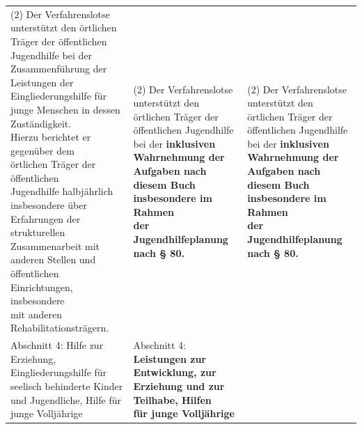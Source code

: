 \documentclass[10pt,a4paper,landscape]{article}
\begin{document}
\begin{longtable}{|L{8.2cm}|L{8.2cm}|L{8.2cm}|}
\hhline{|---|}
(2) Der Verfahrenslotse unterstützt den  \newline örtlichen Träger der öffentlichen  \newline Jugendhilfe bei der \textcolor{diffred}{Zusammenführung} der  \newline \textcolor{diffred}{Leistungen} der \textcolor{diffred}{Eingliederungshilfe für  \newline junge Menschen in dessen Zuständigkeit.  \newline Hierzu berichtet er gegenüber dem  \newline örtlichen Träger der öffentlichen  \newline Jugendhilfe halbjährlich insbesondere über  \newline Erfahrungen der strukturellen  \newline Zusammenarbeit mit anderen Stellen und  \newline öffentlichen Einrichtungen, insbesondere  \newline mit anderen Rehabilitationsträgern.} & (2) Der Verfahrenslotse unterstützt den  \newline örtlichen Träger der öffentlichen  \newline Jugendhilfe bei der \textbf{inklusiven  \newline Wahrnehmung der Aufgaben nach  \newline diesem Buch insbesondere im Rahmen  \newline der Jugendhilfeplanung nach \S{} 80.} & (2) Der Verfahrenslotse unterstützt den  \newline örtlichen Träger der öffentlichen  \newline Jugendhilfe bei der \textbf{inklusiven  \newline Wahrnehmung der Aufgaben nach } \textbf{diesem Buch insbesondere im Rahmen  \newline der Jugendhilfeplanung nach \S{} 80.} \\
\hhline{|---|}
Abschnitt 4:   \newline Hilfe zur Erziehung, Eingliederungshilfe für  \newline seelisch behinderte Kinder und  \newline Jugendliche, Hilfe für junge Volljährige & Abschnitt 4:   \newline \textbf{\textcolor{diffred}{Leistungen zur Entwicklung, zur  \newline Erziehung und zur Teilhabe, Hilfen  \newline für junge Volljährige}} &  \\

\end{longtable}
\end{document}
